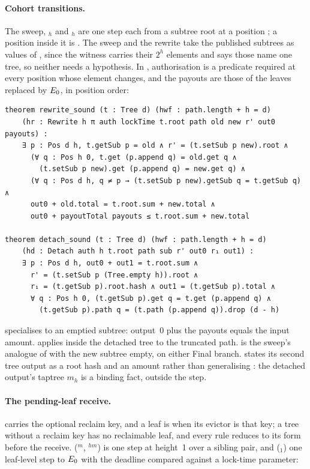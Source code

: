 \paragraph{Cohort transitions.} The sweep, $_h$ and
$_h$ are one step each from a subtree root at a position
; a position inside it is . The sweep
and the rewrite take the published subtrees as values of ,
since the witness carries their $2^h$ elements and 
says those name one tree, so neither needs a  hypothesis.
In , authorisation is a predicate required at every
position whose element changes, and the payouts are those of the leaves
replaced by $E_0$, in position order:

\begin{lstlisting}
theorem rewrite_sound (t : Tree d) (hwf : path.length + h = d)
    (hr : Rewrite h π auth lockTime t.root path old new r' out0 payouts) :
    ∃ p : Pos d h, t.getSub p = old ∧ r' = (t.setSub p new).root ∧
      (∀ q : Pos h 0, t.get (p.append q) = old.get q ∧
        (t.setSub p new).get (p.append q) = new.get q) ∧
      (∀ q : Pos d h, q ≠ p → (t.setSub p new).getSub q = t.getSub q) ∧
      out0 + old.total = t.root.sum + new.total ∧
      out0 + payoutTotal payouts ≤ t.root.sum + new.total

theorem detach_sound (t : Tree d) (hwf : path.length + h = d)
    (hd : Detach auth h t.root path sub r' out0 r₁ out1) :
    ∃ p : Pos d h, out0 + out1 = t.root.sum ∧
      r' = (t.setSub p (Tree.empty h)).root ∧
      r₁ = (t.getSub p).root.hash ∧ out1 = (t.getSub p).total ∧
      ∀ q : Pos h 0, (t.getSub p).get q = t.get (p.append q) ∧
        (t.getSub p).path q = (t.path (p.append q)).drop (d - h)
\end{lstlisting}

 specialises  to
an emptied subtree: output~0 plus the payouts equals the input amount.
 applies  inside the
detached tree to the truncated path.  is the
sweep's analogue of  with the new subtree empty, on
either \textsf{Final} branch.  states its second tree output as a
root hash and an amount rather than generalising : the
detached output's taptree $m_h$ is a binding fact, outside the step.

\paragraph{The pending-leaf receive.}  carries the optional
reclaim key, and a leaf is  when its evictor is that key;
a tree without a reclaim key has no reclaimable leaf, and every rule
reduces to its form before the receive.  ($^{m}$,
$^{hm}$) is one step at height~1 over a sibling pair, and
 ($_1$) one leaf-level step to $E_0$ with the
deadline compared against a lock-time parameter:

